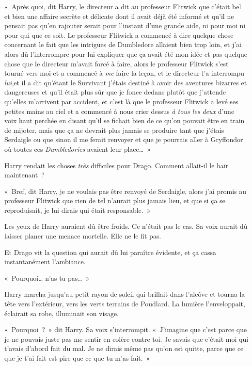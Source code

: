 «~Après quoi, dit Harry, le directeur a dit au professeur Flitwick que c'était bel et bien une affaire secrète et délicate dont il avait déjà été informé et qu'il ne pensait pas qu'en rajouter serait pour l'instant d'une grande aide, ni pour moi ni pour qui que ce soit. Le professeur Flitwick a commencé à dire quelque chose concernant le fait que les intrigues de Dumbledore allaient bien trop loin, et j'ai alors dû l'interrompre pour lui expliquer que ça avait été mon idée et pas quelque chose que le directeur m'avait forcé à faire, alors le professeur Flitwick s'est tourné vers moi et a commencé à \emph{me} faire la leçon, et le directeur l'a interrompu \emph{lui},et il a dit qu'étant le Survivant j'étais destiné à avoir des aventures bizarres et dangereuses et qu'il était plus sûr que je fonce dedans plutôt que j'attende qu'elles m'arrivent par accident, et c'est là que le professeur Flitwick a levé ses petites mains au ciel et a commencé à nous crier dessus \emph{à tous les deux} d'une voix haut perchée en disant qu'il se fichait bien de ce qu'on pouvait être en train de mijoter, mais que ça ne devrait plus jamais se produire tant que j'étais Serdaigle ou que sinon il me ferait renvoyer et que je pourrais aller à Gryffondor où toutes ces \emph{Dumbledories} avaient leur place…~»

Harry rendait les choses \emph{très} difficiles pour Drago. Comment allait-il le haïr maintenant~?

«~Bref, dit Harry, je ne voulais pas être renvoyé de Serdaigle, alors j'ai promis au professeur Flitwick que rien de tel n'aurait plus jamais lieu, et que si ça se reproduisait, je lui dirais qui était responsable.~»

Les yeux de Harry auraient dû être froids. Ce n'était pas le cas. Sa voix aurait dû laisser planer une menace mortelle. Elle ne le fit pas.

Et Drago vit la question qui aurait dû lui paraître évidente, et ça cassa instantanément l'ambiance.

«~Pourquoi… n'as-tu pas…~»

Harry marcha jusqu'au petit rayon de soleil qui brillait dans l'alcôve et tourna la tête vers l'extérieur, vers les verts terrains de Poudlard. La lumière l'enveloppait, éclairait sa robe, illuminait son visage.

«~Pourquoi~?~» dit Harry. Sa voix s'interrompit. «~J'imagine que c'est parce que je ne pouvais juste pas me sentir en colère contre toi. Je savais que c'était moi qui t'avais d'abord fait du mal. Je ne dirais même pas qu'on est quitte, parce que ce que je t'ai fait est pire que ce que tu m'as fait.~»

